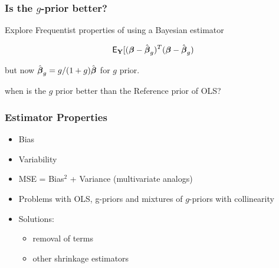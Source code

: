 \documentclass[handout]{beamer}
\begin{document}
\begin{frame}
  \frametitle{Is the $g$-prior better?}
  
Explore Frequentist properties of using a Bayesian estimator

$$\textsf{E}_{\mathbf{Y}}[( \boldsymbol{\beta} - \hat{\boldsymbol{\beta}}_g)^T(\boldsymbol{\beta} -\hat{\boldsymbol{\beta}}_g)$$

but now $\hat{\boldsymbol{\beta}}_g = g/(1+g) \hat{\boldsymbol{\beta}}$ for $g$ prior. \pause

\vfill when is the $g$ prior better than the Reference prior of OLS?
\end{frame}

\begin{frame}\frametitle{Estimator Properties}

  \begin{itemize}
  \item  Bias  \pause
  \item  Variability \pause
  \item MSE = Bias$^2$ + Variance  (multivariate analogs) \pause
\item Problems with OLS, g-priors and mixtures of $g$-priors with collinearity \pause
\item Solutions: \pause
  \begin{itemize}
  \item removal of terms \pause
   \item other shrinkage estimators
  \end{itemize}

  \end{itemize}
\end{frame}
\end{document}
